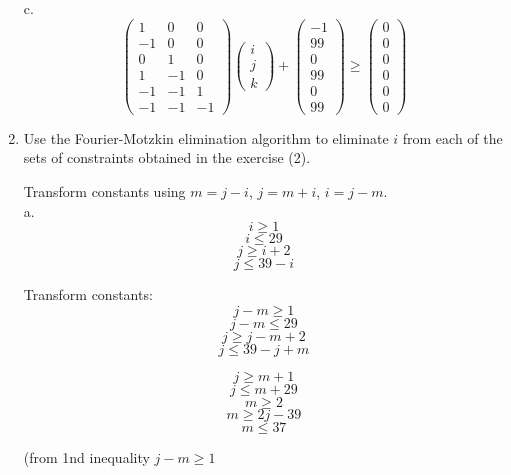 \documentclass[11pt]{article}
\begin{document}
\begin{enumerate}
\begin{Answer}
		      c.
		      $$
			      \begin{pmatrix}
				      1  & 0  & 0  \\
				      -1 & 0  & 0  \\
				      0  & 1  & 0  \\
				      1  & -1 & 0  \\
				      -1 & -1 & 1  \\
				      -1 & -1 & -1
			      \end{pmatrix}
			      \begin{pmatrix}
				      i \\
				      j \\
				      k
			      \end{pmatrix}
			      +
			      \begin{pmatrix}
				      -1 \\
				      99 \\
				      0  \\
				      99 \\
				      0  \\
				      99
			      \end{pmatrix}
			      \ge
			      \begin{pmatrix}
				      0 \\
				      0 \\
				      0 \\
				      0 \\
				      0 \\
				      0
			      \end{pmatrix}
		      $$
	      \end{Answer}
	      \newpage
	\item Use the Fourier-Motzkin elimination algorithm to eliminate $i$ from each of the sets of constraints obtained in the exercise (2).
	      \begin{Answer}
		      Transform constants using $m=j -i$, $j = m + i$, $i = j - m$. \\
		      a.
		      $$i \ge 1$$
		      $$i \le 29$$
		      $$j \ge i + 2$$
		      $$j \le 39 - i$$

		      Transform constants:
		      $$j - m \ge 1$$
		      $$j - m \le 29$$
		      $$j \ge j - m + 2$$
		      $$j \le 39 - j + m$$

		      $$j \ge m + 1$$
		      $$j \le m + 29$$
		      $$m \ge 2$$
		      $$m \ge 2j - 39$$
		      $$m \le 37$$

		      (from 1nd inequality $j - m \ge 1$


\end{Answer}
\end{enumerate}
\end{document}
